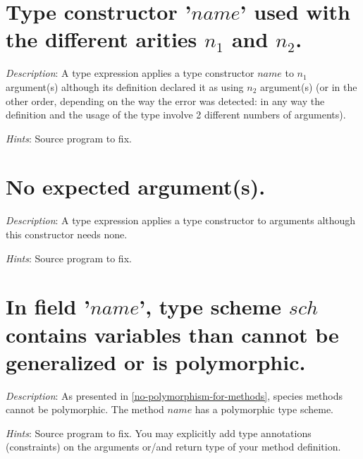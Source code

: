 \section*{Type constructor '$name$' used with the different arities
  $n_1$ and $n_2$.}
{\em Description}: A type expression applies a type constructor $name$
to $n_1$ argument(s) although its definition declared it as using $n_2$
argument(s) (or in the other order, depending on the way the error was
detected: in any way the definition and the usage of the type involve
2 different numbers of arguments).

{\em Hints}: Source program to fix.



\section*{No expected argument(s).}
{\em Description}: A type expression applies a type constructor to
arguments although this constructor needs none.

{\em Hints}: Source program to fix.



\section*{In field '$name$', type scheme $sch$ contains variables than
  cannot be generalized or is polymorphic.}

{\em Description}: As presented in \ref{no-polymorphism-for-methods},
species methods cannot be polymorphic. The method $name$ has a
polymorphic type scheme.

{\em Hints}: Source program to fix. You may explicitly add type
annotations (constraints) on the arguments or/and return type of your
method definition.
